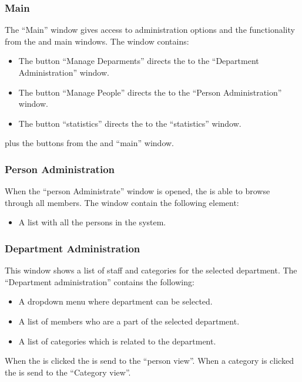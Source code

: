 \subsubsection{Main}
The ``Main'' \admin[] window gives access to administration options and the functionality from the \astaff[] and \aclient[] main windows. The window contains: 
\begin{itemize}
	\item The button ``Manage Deparments'' directs the \admin[] to the ``Department Administration'' window.  
	\item The button ``Manage People'' directs the \admin[] to the ``Person Administration'' window.
	\item The button ``statistics'' directs the \admin[] to the ``statistics'' window.
\end{itemize}
plus the buttons from the \astaff[] and \aclient[] ``main'' window.

\subsubsection{Person Administration}
When the ``person Administrate'' window is opened, the \admin[] is able to browse through all \astaff members. The window contain the following element:
\begin{itemize}
	\item A list with all the persons in the system.
\end{itemize}

\subsubsection{Department Administration}
This window shows a list of staff and categories for the selected department.
The ``Department administration'' contains the following:
\begin{itemize}
	\item A dropdown menu where department can be selected.
	\item A list of \astaff[] members who are a part of the selected department.
	\item A list of categories which is related to the department.
\end{itemize}
When the \astaff[] is clicked the \admin[] is send to the ``person view''.
When a category is clicked the \admin[] is send to the ``Category view''. 


